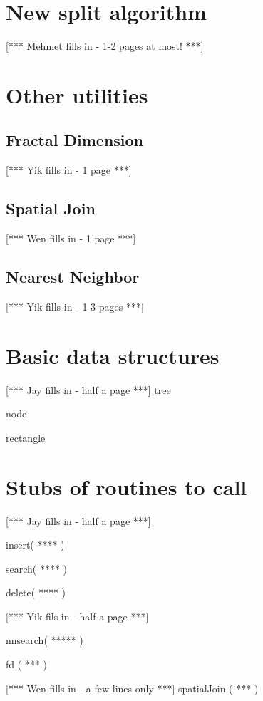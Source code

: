 \section{New split algorithm}
[*** Mehmet fills in - 1-2 pages at most! ***]
%

\section{Other utilities}
\subsection{Fractal Dimension}
[*** Yik fills in - 1 page ***]
%
\subsection{Spatial Join}
[*** Wen fills in - 1 page ***]
%
\subsection{Nearest Neighbor}
[*** Yik fills in - 1-3 pages ***]
%
\appendix
\section{Basic data structures}

[*** Jay fills in - half a page ***]
%
tree

node

rectangle


\section{Stubs of routines to call}
[*** Jay fills in - half a page ***]
%

insert( **** )

search( **** )

delete( **** )

[*** Yik fils in - half a page ***]
%

nnsearch( ***** )

fd ( *** )

[*** Wen fills in - a few lines only ***]
%
spatialJoin ( *** )

\newpage
{}
\tableofcontents



